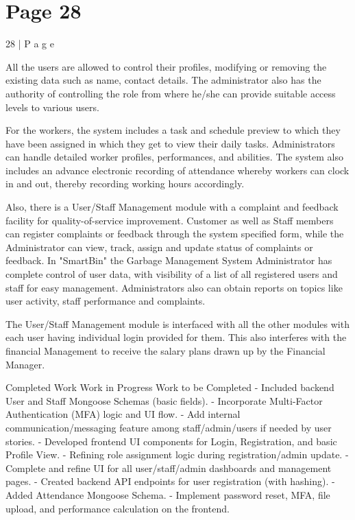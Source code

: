 \documentclass{article}
\begin{document}
\section*{Page 28}
28 | P a g e 
 
All the users are allowed to control their profiles, modifying or removing the existing data 
such as name, contact details. The administrator also has the authority of controlling the 
role from where he/she can provide suitable access levels to various users. 
 
For the workers, the system includes a task and schedule preview to which they have been 
assigned in which they get to view their daily tasks. Administrators can handle detailed 
worker profiles, performances, and abilities. The system also includes an advance 
electronic recording of attendance whereby workers can clock in and out, thereby 
recording working hours accordingly. 
 
Also, there is a User/Staff Management module with a complaint and feedback facility for 
quality-of-service improvement. Customer as well as Staff members can register 
complaints or feedback through the system specified form, while the Administrator can 
view, track, assign and update status of complaints or feedback. In "SmartBin" the Garbage 
Management System Administrator has complete control of user data, with visibility of a 
list of all registered users and staff for easy management. Administrators also can obtain 
reports on topics like user activity, staff performance and complaints. 
 
The User/Staff Management module is interfaced with all the other modules with each user 
having individual login provided for them. This also interferes with the financial 
Management to receive the salary plans drawn up by the Financial Manager. 
 
Completed Work Work in Progress Work to be Completed 
- Included backend User 
and Staff Mongoose 
Schemas (basic fields). 
- Incorporate Multi-Factor 
Authentication (MFA) logic 
and UI flow. 
- Add internal 
communication/messaging 
feature among 
staff/admin/users if needed 
by user stories. 
- Developed frontend UI 
components for Login, 
Registration, and basic 
Profile View. 
- Refining role assignment 
logic during 
registration/admin update. 
- Complete and refine UI for 
all user/staff/admin 
dashboards and 
management pages. 
- Created backend API 
endpoints for user 
registration (with hashing). 
- Added Attendance 
Mongoose Schema. 
- Implement password 
reset, MFA, file upload, and 
performance calculation on 
the frontend. 
\end{document}

